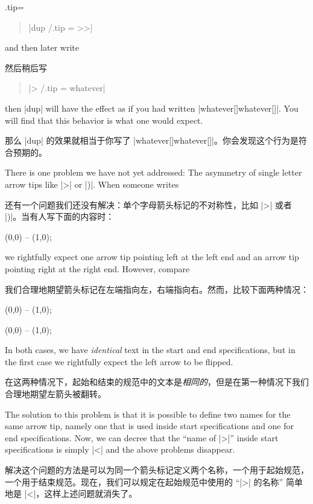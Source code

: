 \begin{handler}{{.tip}{=}}
    \begin{quote}
        |dup /.tip = >>|
    \end{quote}
    and then later write

    然后稍后写

    \begin{quote}
        |> /.tip = whatever|
    \end{quote}
    then |dup| will have the effect as if you had written
    |whatever[]whatever[]|. You will find that this behavior is what one would
    expect.

    那么 |dup| 的效果就相当于你写了
    |whatever[]whatever[]|。你会发现这个行为是符合预期的。



    There is one problem we have not yet addressed: The asymmetry of single
    letter arrow tips like |>| or |)|. When someone writes
    
    还有一个问题我们还没有解决：单个字母箭头标记的不对称性，比如 |>| 或者 |)|。当有人写下面的内容时：
\begin{codeexample}[]
\tikz \draw [<->] (0,0) -- (1,0);
\end{codeexample}
    we rightfully expect one arrow tip pointing left at the left end and an
    arrow tip pointing right at the right end. However, compare
    
    我们合理地期望箭头标记在左端指向左，右端指向右。然而，比较下面两种情况：
\begin{codeexample}[]
\tikz \draw [>->] (0,0) -- (1,0);
\end{codeexample}
\begin{codeexample}[preamble={\usetikzlibrary{arrows.meta}}]
\tikz {} (0,0) -- (1,0);
\end{codeexample}
    In both cases, we have \emph{identical} text in the start and end
    specifications, but in the first case we rightfully expect the left arrow
    to be flipped.

    在这两种情况下，起始和结束的规范中的文本是\emph{相同的}，但是在第一种情况下我们合理地期望左箭头被翻转。

    The solution to this problem is that it is possible to define two names for
    the same arrow tip, namely one that is used inside start specifications and
    one for end specifications. Now, we can decree that the ``name of |>|''
    inside start specifications is simply |<| and the above problems disappear.

    解决这个问题的方法是可以为同一个箭头标记定义两个名称，一个用于起始规范，一个用于结束规范。现在，我们可以规定在起始规范中使用的 ``|>| 的名称'' 简单地是 |<|，这样上述问题就消失了。


\end{handler}
